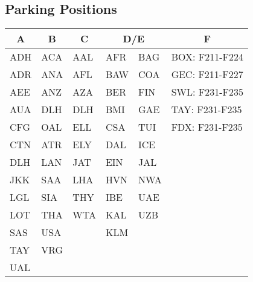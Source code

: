 \subsection{Parking Positions}

\begin{table}[h!]
\begin{tabular}{|l|l|l|ll|l|}
\hline
\multicolumn{1}{|c|}{A} & \multicolumn{1}{c|}{B} & \multicolumn{1}{c|}{C} & \multicolumn{2}{c|}{D/E}    & \multicolumn{1}{c|}{F} \\ \hline
ADH                     & ACA                    & AAL                    & AFR                   & BAG & BOX: F211-F224         \\
ADR                     & ANA                    & AFL                    & BAW                   & COA & GEC: F211-F227         \\
AEE                     & ANZ                    & AZA                    & BER                   & FIN & SWL: F231-F235         \\
AUA                     & DLH                    & DLH                    & BMI                   & GAE & TAY: F231-F235         \\
CFG                     & OAL                    & ELL                    & CSA                   & TUI & FDX: F231-F235         \\
CTN                     & ATR                    & ELY                    & DAL                   & ICE &                        \\
DLH                     & LAN                    & JAT                    & EIN                   & JAL &                        \\
JKK                     & SAA                    & LHA                    & HVN                   & NWA &                        \\
LGL                     & SIA                    & THY                    & IBE                   & UAE &                        \\
LOT                     & THA                    & WTA                    & KAL                   & UZB &                        \\
SAS                     & USA                    &                        & KLM                   &     &                        \\
TAY                     & VRG                    &                        &                       &     &                        \\
UAL                     &                        &                        & \multicolumn{1}{l}{} &     &                        \\ \hline
\end{tabular}
\end{table}
